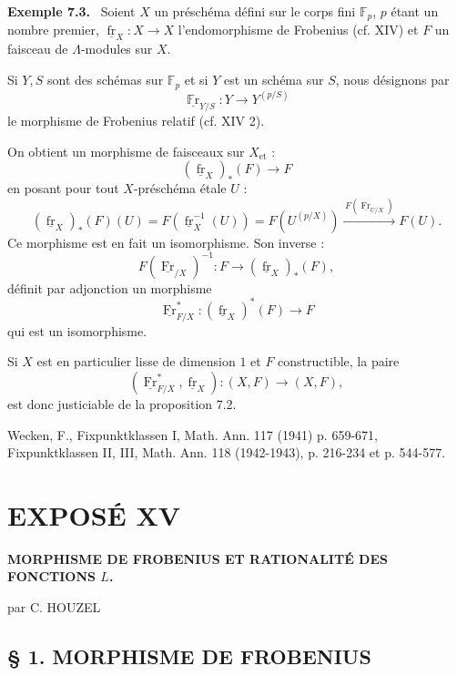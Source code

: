 \documentclass[11pt]{article}
\newenvironment{statement}[1]{\par\medskip\noindent\textbf{#1.}\ }{\par\medskip}
\providecommand{\fr}{\operatorname{fr}}
\providecommand{\Fr}{\operatorname{Fr}}
\providecommand{\Fr}{\operatorname{Fr}}
\providecommand{\fr}{\operatorname{fr}}
\begin{document}
\renewcommand{\fr}{\underline{\operatorname{fr}}}\renewcommand{\Fr}{\underline{\operatorname{Fr}}}
\begin{statement}{Exemple 7.3}
Soient $X$ un préschéma défini sur le corps fini $\mathbb F_p$, $p$ étant un nombre premier, $\fr_X:X\to X$ l'endomorphisme de Frobenius (cf. XIV) et $F$ un faisceau de $\Lambda$-modules sur $X$.

Si $Y,S$ sont des schémas sur $\mathbb F_p$ et si $Y$ est un schéma sur $S$, nous désignons par
\[
\underline{\operatorname{\mathbb{F}r}}_{Y/S}:Y\longrightarrow Y^{(p/S)}
\]
le morphisme de Frobenius relatif (cf. XIV 2).

On obtient un morphisme de faisceaux sur $X_{\mathrm{et}}$ :
\[
(\fr_X)_*(F)\longrightarrow F
\]
en posant pour tout $X$-préschéma étale $U$ :
\[
(\fr_X)_*(F)(U)=F(\fr_X^{-1}(U))=F(U^{(p/X)})
 \xrightarrow{\,F(\Fr_{U/X})\,}F(U).
\]
Ce morphisme est en fait un isomorphisme. Son inverse :
\[
F(\Fr_{/X})^{-1}:F\longrightarrow (\fr_X)_*(F),
\]
définit par adjonction un morphisme
\[
\Fr_{F/X}^*:(\fr_X)^*(F)\longrightarrow F
\]
qui est un isomorphisme.

Si $X$ est en particulier lisse de dimension $1$ et $F$ constructible, la paire
\[
(\Fr_{F/X}^*,\fr_X):(X,F)\longrightarrow (X,F),
\]
est donc justiciable de la proposition 7.2.
\end{statement}

\noindent[1] Wecken, F., Fixpunktklassen I, Math. Ann. 117 (1941) p. 659-671, Fixpunktklassen II, III, Math. Ann. 118 (1942-1943), p. 216-234 et p. 544-577.

\section*{EXPOSÉ XV}
\renewcommand{\fr}{\underline{\underline{\operatorname{fr}}}}\renewcommand{\Fr}{\underline{\underline{\operatorname{Fr}}}}
\begin{center}
\Large\bfseries
MORPHISME DE FROBENIUS ET RATIONALITÉ DES FONCTIONS $L$.

\medskip
par C. HOUZEL
\end{center}

\subsection*{§ 1. MORPHISME DE FROBENIUS}
\end{document}

